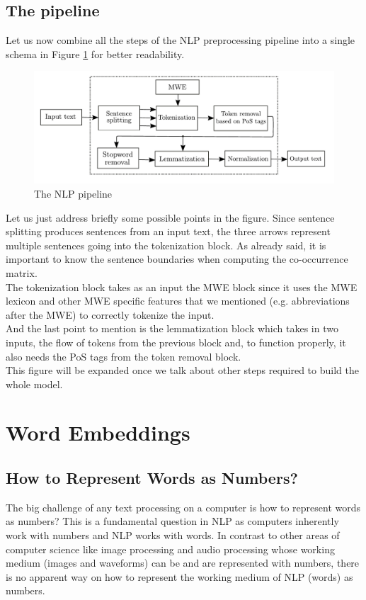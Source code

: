 \documentclass[12pt]{article}
\numberwithin{equation}{section}
\begin{document}
\begin{spacing}{1.5}
	\subsection{The pipeline}
	Let us now combine all the steps of the NLP preprocessing pipeline into a single schema in Figure \ref{NLP_pipeline_label} for better readability.
	\begin{figure}[H]
		\centering
		\hspace*{-1.0cm}
		\includegraphics[scale=0.85]{NLP_pipeline}		
		\caption{The NLP pipeline}
		\label{NLP_pipeline_label}
	\end{figure}
	Let us just address briefly some possible points in the figure. Since sentence splitting produces sentences from an input text, the three arrows represent multiple sentences going into the tokenization block. As already said, it is important to know the sentence boundaries when computing the co-occurrence matrix. \\
	The tokenization block takes as an input the MWE block since it uses the MWE lexicon and other MWE specific features that we mentioned (e.g. abbreviations after the MWE) to correctly tokenize the input. \\
	And the last point to mention is the lemmatization block which takes in two inputs, the flow of tokens from the previous block and, to function properly, it also needs the PoS tags from the token removal block. \\
	This figure will be expanded once we talk about other steps required to build the whole model. 

	
	\newpage 
	\section{Word Embeddings}
	\subsection{How to Represent Words as Numbers?}
	The big challenge of any text processing on a computer is how to represent words as numbers? This is a fundamental question in NLP as computers inherently work with numbers and NLP works with words. In contrast to other areas of computer science like image processing and audio processing whose working medium (images and waveforms) can be and are represented with numbers, there is no apparent way on how to represent the working medium of NLP (words) as numbers. \\
	

\end{spacing}
\end{document}
